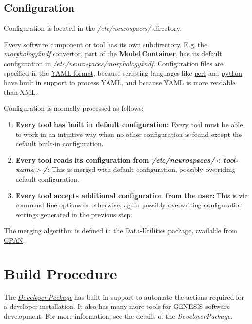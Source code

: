 \documentclass[12pt]{article}
\begin{document}
\subsection*{Configuration}

Configuration is located in the {\it /etc/neurospaces/} directory.

Every software component or tool has its own subdirectory. E.g. the {\it morphology2ndf} convertor, part of the {\bf Model\,Container}, has its default configuration in {\it /etc/neurospaces/morphology2ndf}. Configuration files are specified in the \href{http://www.yaml.org/}{YAML format}, because scripting languages like \href{http://www.perl.org/}{perl} and \href{http://www.python.org/}{python} have built in support to process YAML, and because YAML is more readable than XML.

Configuration is normally processed as follows:
\begin{enumerate}
\item {\bf Every tool has built in default configuration:} Every tool must be able to work in an intuitive way when no other configuration is found except the default built-in configuration.
\item {\bf Every tool reads its configuration from {\it /etc/neurospaces/$<$tool-name$>$/}:} This is merged with default configuration, possibly overriding default configuration.
\item {\bf Every tool accepts additional configuration from the user:} This is via command line options or otherwise, again possibly overwriting configuration settings generated in the previous step. 
\end{enumerate}
The merging algorithm is defined in the \href{http://search.cpan.org/dist/Data-Utilities/}{Data-Utilities package}, available from \href{http://www.cpan.org/}{CPAN}.


\section*{Build Procedure}

The \href{../developer-package/developer-package.tex}{\it Developer\,Package} has built in support to automate the actions required for a developer installation. It also has many more tools for GENESIS software development. For more information, see the details of the {\it DeveloperPackage}.
\end{document}
